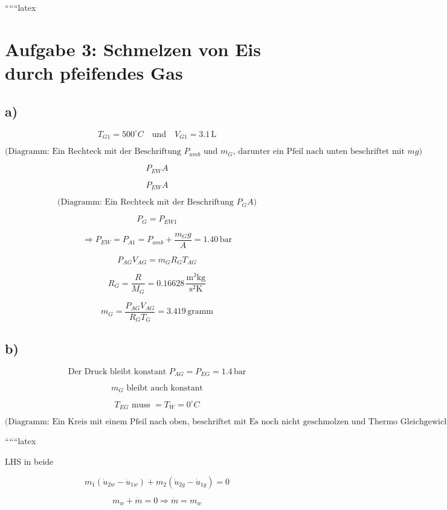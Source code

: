 
``````latex


\section*{Aufgabe 3: Schmelzen von Eis durch pfeifendes Gas}

\subsection*{a)}

\[
T_{G1} = 500^\circ C \quad \text{und} \quad V_{G1} = 3.1 \, \text{L}
\]

\[
\text{(Diagramm: Ein Rechteck mit der Beschriftung } P_{amb} \text{ und } m_G \text{, darunter ein Pfeil nach unten beschriftet mit } mg \text{)}
\]

\[
P_{EW} A
\]

\[
P_{EW} A
\]

\[
\text{(Diagramm: Ein Rechteck mit der Beschriftung } P_G A \text{)}
\]

\[
P_G = P_{EW1}
\]

\[
\Rightarrow P_{EW} = P_{A1} = P_{amb} + \frac{m_G g}{A} = 1.40 \, \text{bar}
\]

\[
P_{AG} V_{AG} = m_G R_G T_{AG}
\]

\[
R_G = \frac{R}{M_G} = 0.16628 \, \frac{\text{m}^3 \text{kg}}{\text{s}^2 \text{K}}
\]

\[
m_G = \frac{P_{AG} V_{AG}}{R_G T_{G}} = 3.419 \, \text{gramm}
\]

\subsection*{b)}

\[
\text{Der Druck bleibt konstant } P_{AG} = P_{EG} = 1.4 \, \text{bar}
\]

\[
m_G \text{ bleibt auch konstant}
\]

\[
T_{EG} \text{ muss } = T_W = 0^\circ C
\]

\[
\text{(Diagramm: Ein Kreis mit einem Pfeil nach oben, beschriftet mit } \text{Es noch nicht geschmolzen} \text{ und } \text{Thermo Gleichgewicht} \text{)}
\]

``````latex


\noindent
LHS in beide

\[
m_1 (\dot{u}_{2w} - \dot{u}_{1w}) + m_2 (\dot{u}_{2g} - \dot{u}_{1g}) = 0
\]

\[
m_w + \dot{m} = 0 \Rightarrow \dot{m} = m_w
\]


